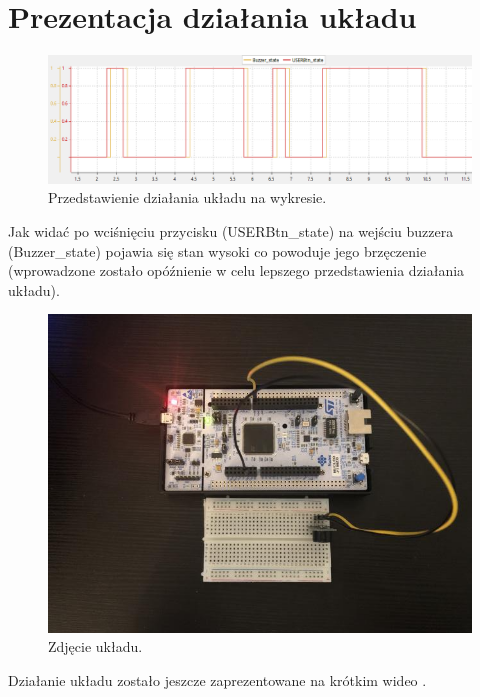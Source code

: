 \documentclass[11pt, a4paper]{article}
\begin{document}
\section{Prezentacja działania układu}

\vspace{0.5cm}
\begin{figure}[h!]
    \centering
    \includegraphics[width=1\textwidth]{fig/obrazki/buzzer/SWVbuzzer.png}
    \caption{Przedstawienie działania układu na wykresie.}
    \label{fig:my_label}
\end{figure}

Jak widać po wciśnięciu przycisku (USERBtn\_state) na wejściu buzzera (Buzzer\_state) pojawia się stan wysoki co powoduje jego brzęczenie (wprowadzone zostało opóźnienie w celu lepszego przedstawienia działania układu).

\newpage

\vspace{0.5cm}
\begin{figure}[h!]
    \centering
    \includegraphics[width=1\textwidth]{fig/obrazki/buzzer/ZdjecieUkladu.png}
    \caption{Zdjęcie układu.}
    \label{fig:my_label}
\end{figure}

Działanie układu zostało jeszcze zaprezentowane na krótkim wideo \cite{youtube}.

\printbibliography[heading=bibintoc]
\end{document}
